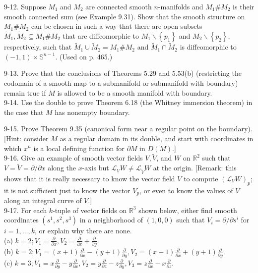 \documentclass[10pt]{article}
\begin{document}
9-12. Suppose $M_{1}$ and $M_{2}$ are connected smooth $n$-manifolds and $M_{1} \# M_{2}$ is their smooth connected sum (see Example 9.31). Show that the smooth structure on $M_{1} \# M_{2}$ can be chosen in such a way that there are open subsets $\widetilde{M}_{1}, \widetilde{M}_{2} \subseteq M_{1} \# M_{2}$ that are diffeomorphic to $M_{1} \backslash\left\{p_{1}\right\}$ and $M_{2} \backslash\left\{p_{2}\right\}$, respectively, such that $\widetilde{M}_{1} \cup \widetilde{M}_{2}=M_{1} \# M_{2}$ and $\widetilde{M}_{1} \cap \widetilde{M}_{2}$ is diffeomorphic to $(-1,1) \times \mathbb{S}^{n-1}$. (Used on p. 465.)

9-13. Prove that the conclusions of Theorems 5.29 and 5.53(b) (restricting the codomain of a smooth map to a submanifold or submanifold with boundary) remain true if $M$ is allowed to be a smooth manifold with boundary.\\
9-14. Use the double to prove Theorem 6.18 (the Whitney immersion theorem) in the case that $M$ has nonempty boundary.

9-15. Prove Theorem 9.35 (canonical form near a regular point on the boundary). [Hint: consider $M$ as a regular domain in its double, and start with coordinates in which $x^{n}$ is a local defining function for $\partial M$ in $D(M)$.]\\
9-16. Give an example of smooth vector fields $V, \widetilde{V}$, and $W$ on $\mathbb{R}^{2}$ such that $V=\widetilde{V}=\partial / \partial x$ along the $x$-axis but $\mathscr{L}_{V} W \neq \mathscr{L}_{\tilde{V}} W$ at the origin. [Remark: this shows that it is really necessary to know the vector field $V$ to compute $\left(\mathscr{L}_{V} W\right)_{p}$; it is not sufficient just to know the vector $V_{p}$, or even to know the values of $V$ along an integral curve of $V$.]\\
9-17. For each $k$-tuple of vector fields on $\mathbb{R}^{3}$ shown below, either find smooth coordinates $\left(s^{1}, s^{2}, s^{3}\right)$ in a neighborhood of $(1,0,0)$ such that $V_{i}=\partial / \partial s^{i}$ for $i=1, \ldots, k$, or explain why there are none.\\
(a) $k=2 ; V_{1}=\frac{\partial}{\partial x}, V_{2}=\frac{\partial}{\partial x}+\frac{\partial}{\partial y}$.\\
(b) $k=2 ; V_{1}=(x+1) \frac{\partial}{\partial x}-(y+1) \frac{\partial}{\partial y}, V_{2}=(x+1) \frac{\partial}{\partial x}+(y+1) \frac{\partial}{\partial y}$.\\
(c) $k=3 ; V_{1}=x \frac{\partial}{\partial y}-y \frac{\partial}{\partial x}, V_{2}=y \frac{\partial}{\partial z}-z \frac{\partial}{\partial y}, V_{3}=z \frac{\partial}{\partial x}-x \frac{\partial}{\partial z}$.
\end{document}
